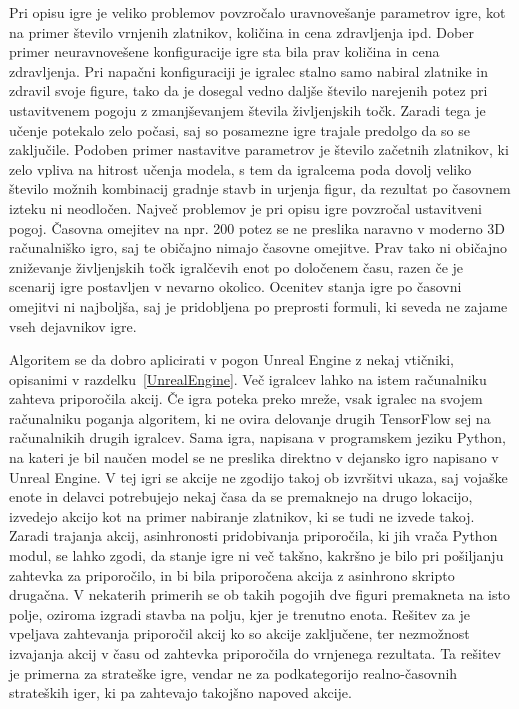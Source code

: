 \documentclass[a4paper, 12pt]{book}
\begin{document}
Pri opisu igre je veliko problemov povzročalo uravnovešanje parametrov igre, kot na primer število vrnjenih zlatnikov, količina in cena zdravljenja ipd.
Dober primer neuravnovešene konfiguracije igre sta bila prav količina in cena zdravljenja.
Pri napačni konfiguraciji je igralec stalno samo nabiral zlatnike in zdravil svoje figure, tako da je dosegal vedno daljše število narejenih potez pri ustavitvenem pogoju z zmanjševanjem števila življenjskih točk.
Zaradi tega je učenje potekalo zelo počasi, saj so posamezne igre trajale predolgo da so se zaključile.
Podoben primer nastavitve parametrov je število začetnih zlatnikov, ki zelo vpliva na hitrost učenja modela, s tem da igralcema poda dovolj veliko število možnih kombinacij gradnje stavb in urjenja figur, da rezultat po časovnem izteku ni neodločen.
Največ problemov je pri opisu igre povzročal ustavitveni pogoj.
Časovna omejitev na npr. 200 potez se ne preslika naravno v moderno 3D računalniško igro, saj te običajno nimajo časovne omejitve.
Prav tako ni običajno zniževanje življenjskih točk igralčevih enot po določenem času, razen če je scenarij igre postavljen v nevarno okolico.
Ocenitev stanja igre po časovni omejitvi ni najboljša, saj je pridobljena po preprosti formuli, ki seveda ne zajame vseh dejavnikov igre.

Algoritem se da dobro aplicirati v pogon Unreal Engine z nekaj vtičniki, opisanimi v razdelku~\ref{UnrealEngine}. Več igralcev lahko na istem računalniku zahteva priporočila akcij. 
Če igra poteka preko mreže, vsak igralec na svojem računalniku poganja algoritem, ki ne ovira delovanje drugih TensorFlow sej na računalnikih drugih igralcev.
Sama igra, napisana v programskem jeziku Python, na kateri je bil naučen model se ne preslika direktno v dejansko igro napisano v Unreal Engine.
V tej igri se akcije ne zgodijo takoj ob izvršitvi ukaza, saj vojaške enote in delavci potrebujejo nekaj časa da se premaknejo na drugo lokacijo, izvedejo akcijo kot na primer nabiranje zlatnikov, ki se tudi ne izvede takoj.
Zaradi trajanja akcij, asinhronosti pridobivanja priporočila, ki jih vrača Python modul, se lahko zgodi, da stanje igre ni več takšno, kakršno je bilo pri pošiljanju zahtevka za priporočilo, in bi bila priporočena akcija z asinhrono skripto drugačna. 
V nekaterih primerih se ob takih pogojih dve figuri premakneta na isto polje, oziroma izgradi stavba na polju, kjer je trenutno enota. 
Rešitev za je vpeljava zahtevanja priporočil akcij ko so akcije zaključene, ter nezmožnost izvajanja akcij v času od zahtevka priporočila do vrnjenega rezultata.
Ta rešitev je primerna za strateške igre, vendar ne za podkategorijo realno-časovnih strateških iger, ki pa zahtevajo takojšno napoved akcije.
\end{document}
